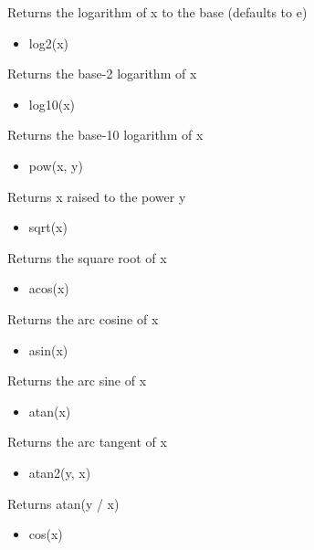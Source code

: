 \documentclass[11pt]{article}
\providecommand{\tightlist}{%
      \setlength{\itemsep}{0pt}\setlength{\parskip}{0pt}}
\begin{document}
Returns the logarithm of x to the base (defaults to e)

\begin{itemize}
\tightlist
\item
  log2(x)
\end{itemize}

Returns the base-2 logarithm of x

\begin{itemize}
\tightlist
\item
  log10(x)
\end{itemize}

Returns the base-10 logarithm of x

\begin{itemize}
\tightlist
\item
  pow(x, y)
\end{itemize}

Returns x raised to the power y

\begin{itemize}
\tightlist
\item
  sqrt(x)
\end{itemize}

Returns the square root of x

\begin{itemize}
\tightlist
\item
  acos(x)
\end{itemize}

Returns the arc cosine of x

\begin{itemize}
\tightlist
\item
  asin(x)
\end{itemize}

Returns the arc sine of x

\begin{itemize}
\tightlist
\item
  atan(x)
\end{itemize}

Returns the arc tangent of x

\begin{itemize}
\tightlist
\item
  atan2(y, x)
\end{itemize}

Returns atan(y / x)

\begin{itemize}
\tightlist
\item
  cos(x)
\end{itemize}
\end{document}

